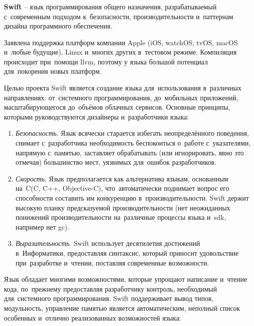 \subsubsection{}
\label{sec:development:arch:ios:swift}

\textbf{Swift} -- язык программирования общего назначения, разрабатываемый с~современным подходом к~безопасности, производительности и~паттернам дизайна программного обеспечения\cite{swift:about}. 

Заявлена поддержка платформ компании Apple (iOS, watchOS, tvOS, macOS и~любые будущие), Linux и~многих других в~тестовом режиме. Компиляция происходит при~помощи \gls{llvm}, поэтому у языка большой потенциал для~покорения новых платформ.

Целью проекта Swift является создание языка для~использования в~различных направлениях: от~системного программирования, до~мобильных приложений, масштабирующегося до~объёмов облачных сервисов. Основные принципы, которыми руководствуются дизайнеры и~разработчики языка:

\begin{enumerate}
	\item \emph{Безопасность}. Язык всячески старается избегать неопределённого поведения, снимает с~разработчика необходимость беспокоиться о~работе с~указателями, напрямую с~памятью, заставляет обрабатывать (или игнорировать, явно это отмечая) большинство мест, уязвимых для~ошибок разработчиков.
	\item \emph{Скорость}. Язык предполагается как альтернатива языкам, основанным на~C(C, C++, Objective-C), что~автоматически поднимает вопрос его способности составить им конкуренцию в~производительности. Swift держит высокую планку предсказуемой производительности (нет неожиданных понижений производительности на~различные процессы языка и~\gls{sdk}, например нет \gls{gc}).
	\item \emph{Выразительность}. Swift использует десятилетия достижений в~Информатики, предоставляя синтаксис, который приносит удовольствие при~разработке и~чтении, поставляя современные возможности.  
\end{enumerate}

Язык обладает многими возможностями, которые упрощают написание и~чтение кода, по~прежнему предоставляя разработчику контроль, необходимый для~системного программирования. Swift поддерживает вывод типов, модульность, управление памятью является автоматическим, неполный список особенных и~отлично реализованных возможностей языка:

